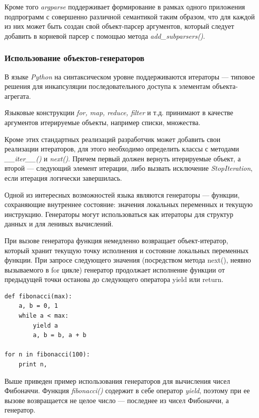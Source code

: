 Кроме того \textit{argparse} поддерживает формирование в рамках одного приложения
подпрограмм с совершенно различной семантикой таким образом, что
для каждой из них может быть создан свой объект-парсер аргументов,
который следует добавить в корневой парсер с помощью метода \textit{add\_subparsers()}.

\subsubsection{Использование объектов-генераторов}
\label{ssn:generators}
В языке \textit{Python} на синтаксическом уровне поддерживаются итераторы\cite{gamma} ---
типовое решения для инкапсуляции последовательного доступа к элементам объекта-агрегата.

Языковые конструкции \textit{for, map, reduce, filter} и т.д. принимают в качестве аргументов
итерируемые объекты, например списки, множества.

Кроме этих стандартных реализаций разработчик может добавить свои реализации итераторов,
для этого необходимо определить классы с методами \textit{\_\_iter\_\_()} и \textit{next()}.
Причем первый должен вернуть итерируемые объект, а второй --- следующий элемент итерации, либо 
вызвать исключение \textit{StopIteration}, если итерация логически завершилась.

Одной из интересных возможностей языка являются генераторы --- функции, 
сохраняющие внутреннее состояние: значения локальных переменных и текущую инструкцию. 
Генераторы могут использоваться как итераторы для структур данных и для ленивых вычислений.

При вызове генератора функция немедленно возвращает объект-итератор, 
который хранит текущую точку исполнения и состояние локальных переменных функции. 
При запросе следующего значения (посредством метода next(), неявно вызываемого в for цикле) 
генератор продолжает исполнение функции от предыдущей точки останова до следующего оператора yield или return.

\begin{lstlisting}[frame=single]
def fibonacci(max):        
    a, b = 0, 1
    while a < max:
        yield a            
        a, b = b, a + b    

for n in fibonacci(100):   
    print n,               

\end{lstlisting}

Выше приведен пример использования генераторов для вычисления чисел Фибоначчи.
Функция \textit{fibonacci()} содержит в себе оператор \textit{yield}, поэтому при ее вызове
возвращается не целое число --- последнее из чисел Фибоначчи, а генератор.

